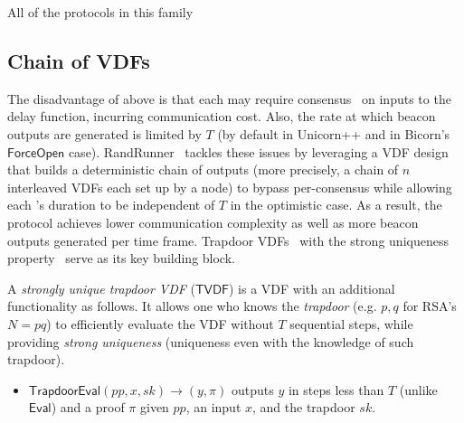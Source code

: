 All of the protocols in this family

\subsection{Chain of VDFs}
\label{subsection:randrunner}
The disadvantage of above is that each \epoch may require consensus~\cite{castro1999practical} on inputs to the delay function, incurring communication cost.
Also, the rate at which beacon outputs are generated is limited by $T$ (by default in Unicorn++ and in Bicorn's $\mathsf{ForceOpen}$ case).
RandRunner~\cite{schindler2021randrunner} tackles these issues by leveraging a VDF design that builds a deterministic chain of outputs (more precisely, a chain of $n$ interleaved VDFs each set up by a node) to bypass per-\epoch consensus while allowing each \epoch's duration to be independent of $T$ in the optimistic case.
As a result, the protocol achieves lower communication complexity as well as more beacon outputs generated per time frame.
Trapdoor VDFs~\cite{wesolowski2019efficient} with the strong uniqueness property~\cite{schindler2021randrunner} serve as its key building block.

\begin{definition}
A \textit{strongly unique trapdoor VDF} ($\mathsf{TVDF}$) is a VDF with an additional functionality as follows.
It allows one who knows the \textit{trapdoor} (e.g. $p, q$ for RSA's $N = p q$) to efficiently evaluate the VDF without $T$ sequential steps, while providing \textit{strong uniqueness} (uniqueness even with the knowledge of such trapdoor).
\begin{itemize}
    \item $\mathsf{TrapdoorEval}(pp, x, sk) \rightarrow (y, \pi)$ outputs $y$ in steps less than $T$ (unlike $\mathsf{Eval}$) and a proof $\pi$ given $pp$, an input $x$, and the trapdoor $sk$.
\end{itemize}
\end{definition}

